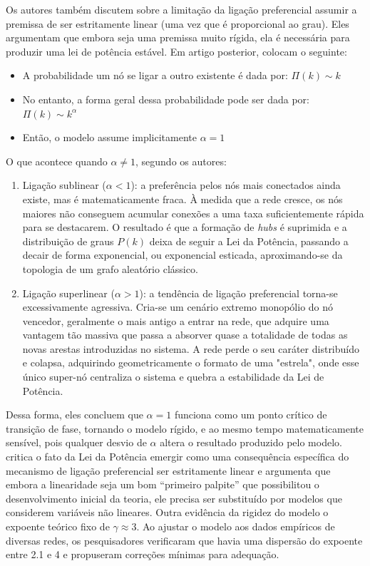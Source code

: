 \documentclass[12pt,oneside,a4paper,brazil,sumario=tradicional]{abntex2}
\begin{document}
Os autores também discutem sobre a limitação da ligação preferencial assumir a premissa de ser estritamente linear (uma vez que é proporcional ao grau). Eles argumentam que embora seja uma premissa muito rígida, ela é necessária para produzir uma lei de potência estável. Em artigo posterior,  colocam o seguinte:

\begin{itemize}
  \item A probabilidade um nó se ligar a outro existente é dada por: $\Pi(k) \sim k$
  \item No entanto, a forma geral dessa probabilidade pode ser dada por: $\Pi(k) \sim k^{\alpha}$
  \item Então, o modelo assume implicitamente $\alpha = 1$
\end{itemize}
O que acontece quando $\alpha \neq 1$, segundo os autores:

\begin{enumerate}
  \item Ligação sublinear ($\alpha < 1$):  a preferência pelos nós mais conectados ainda existe, mas é matematicamente fraca. À medida que a rede cresce, os nós maiores não conseguem acumular conexões a uma taxa suficientemente rápida para se destacarem. O resultado é que a formação de \textit{hubs }é suprimida e a distribuição de graus $P(k)$ deixa de seguir a Lei da Potência, passando a decair de forma exponencial, ou exponencial esticada, aproximando-se da topologia de um grafo aleatório clássico.
  \item Ligação superlinear ($\alpha > 1$): a tendência de ligação preferencial torna-se excessivamente agressiva. Cria-se um cenário extremo monopólio do nó vencedor, geralmente o mais antigo a entrar na rede, que adquire uma vantagem tão massiva que passa a absorver quase a totalidade de todas as novas arestas introduzidas no sistema. A rede perde o seu caráter distribuído e colapsa, adquirindo geometricamente o formato de uma "estrela", onde esse único super-nó centraliza o sistema e quebra a estabilidade da Lei de Potência.
\end{enumerate}
Dessa forma, eles concluem que $\alpha = 1$ funciona como um ponto crítico de transição de fase, tornando o modelo rígido, e ao mesmo tempo matematicamente sensível, pois qualquer desvio de $\alpha$ altera o resultado produzido pelo modelo.  critica o fato da Lei da Potência emergir como uma consequência específica do mecanismo de ligação preferencial ser estritamente linear e argumenta que embora a linearidade seja um bom “primeiro palpite” que possibilitou o desenvolvimento inicial da teoria, ele precisa ser substituído por modelos que considerem variáveis não lineares. Outra evidência da rigidez do modelo o expoente teórico fixo de $\gamma \approx 3$. Ao ajustar o modelo aos dados empíricos de diversas redes, os pesquisadores verificaram que havia uma dispersão do expoente entre 2.1 e 4 e propuseram correções mínimas para adequação.
\end{document}
